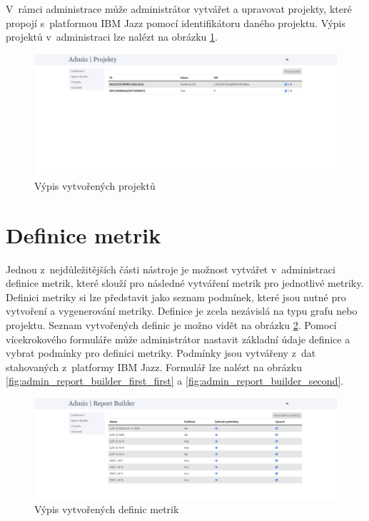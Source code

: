 \documentclass[czech,master]{diploma}
\begin{document}
V~rámci administrace může administrátor vytvářet a upravovat projekty, které propojí s~platformou IBM Jazz pomocí identifikátoru daného projektu. Výpis projektů v~administraci lze nalézt na obrázku \ref{fig:metrics_tool_admin_projects}.


\begin{figure}[!ht]
    \centering
    \includegraphics[width=1\textwidth]{Diplomka/Figures/metrics_tool/admin_projects.jpg}
    \caption{Výpis vytvořených projektů}
    \label{fig:metrics_tool_admin_projects}
\end{figure}
\newpage
\section{Definice metrik}
Jednou z~nejdůležitějších části nástroje je možnost vytvářet v~administraci definice metrik, které slouží pro následné vytváření metrik pro jednotlivé metriky. Definici metriky si lze představit jako seznam podmínek, které jsou nutné pro vytvoření a vygenerování metriky. Definice je zcela nezávislá na typu grafu nebo projektu. Seznam vytvořených definic je možno vidět na obrázku \ref{fig:admin_report_builder}. Pomocí vícekrokového formuláře může administrátor nastavit základní údaje definice a vybrat podmínky pro definici metriky. Podmínky jsou vytvářeny z~dat stahovaných z~platformy IBM Jazz. Formulář lze nalézt na obrázku \ref{fig:admin_report_builder_first_first} a \ref{fig:admin_report_builder_second}.

\begin{figure}[!ht]
    \centering
    \includegraphics[width=1\textwidth]{Diplomka/Figures/metrics_tool/admin_report_builder.jpg}
    \caption{Výpis vytvořených definic metrik}
    \label{fig:admin_report_builder}
\end{figure}
\end{document}
